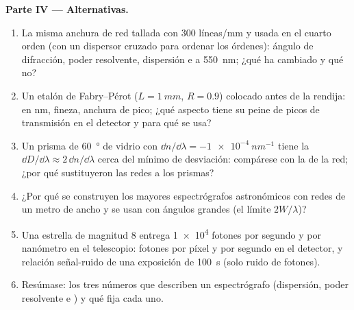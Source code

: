 \begin{problem}
\medskip
\noindent\textbf{Parte IV --- Alternativas.}
\begin{enumerate}[resume]
  \item La misma anchura de red tallada con $300$ líneas/mm y usada en
        el cuarto orden (con un dispersor cruzado para ordenar los órdenes):
        ángulo de difracción, poder resolvente, dispersión e  a \qty{550}{nm}; ¿qué ha cambiado y qué no?
  \item Un etalón de Fabry--Pérot ($L = \qty{1}{mm}$, $R = 0.9$) colocado antes
        de la rendija:  en nm, fineza, anchura de pico; ¿qué
        aspecto tiene su peine de picos de transmisión en el detector
        y para qué se usa?
  \item Un prisma de \qty{60}{\degree} de vidrio con $\dd n/\dd\lambda = \qty{-1e-4}{nm^{-1}}$
        tiene la  $\dd D/\dd\lambda \approx 2\,\dd n/\dd\lambda$ cerca del
        mínimo de desviación: compárese con la de la red; ¿por qué sustituyeron las redes
        a los prismas?
  \item ¿Por qué se construyen los mayores espectrógrafos astronómicos con
        redes de un metro de ancho y se usan con ángulos grandes (el límite
        $2W/\lambda$)?
  \item Una estrella de magnitud 8 entrega \qty{1e4}{} fotones por segundo y
        por nanómetro en el telescopio: fotones por píxel y por segundo
        en el detector, y relación señal-ruido de una exposición de \qty{100}{s}
        (solo ruido de fotones).
  \item Resúmase: los tres números que describen un espectrógrafo
        (dispersión, poder resolvente e ) y qué
        fija cada uno.
\end{enumerate}
\end{problem}
